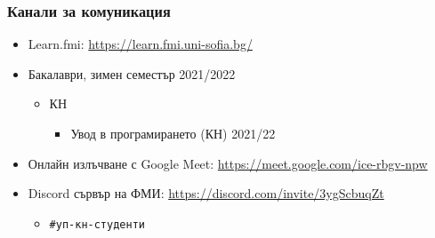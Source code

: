 \documentclass[alsotrans]{beamerswitch}
\begin{document}
\begin{frame}
  \frametitle{Канали за комуникация}

  \begin{itemize}
  \item Learn.fmi: \url{https://learn.fmi.uni-sofia.bg/}
  \item Бакалаври, зимен семестър 2021/2022
    \begin{itemize}
    \item КН
      \begin{itemize}
      \item Увод в програмирането (КН) 2021/22
      \end{itemize}
    \end{itemize}
  \item Онлайн излъчване с Google Meet: \url{https://meet.google.com/ice-rbgv-npw}
  \item Discord сървър на ФМИ: \url{https://discord.com/invite/3ygScbuqZt}
    \begin{itemize}
    \item \tt{\#уп-кн-студенти}
    \end{itemize}
  \end{itemize}
\end{frame}
\end{document}
